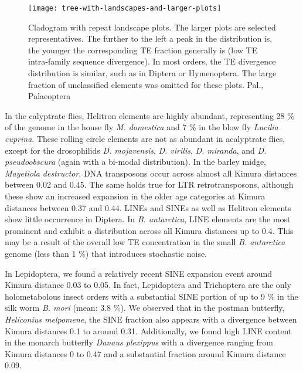 \begin{figure}[h!]
\begin{center}
\texttt{[image: tree-with-landscapes-and-larger-plots]}
\caption[Arthropod repeat landscapes]{{Cladogram with repeat landscape
plots.  The larger plots are selected representatives. The further to
the left a peak in the distribution is, the younger the corresponding TE
fraction generally is (low TE intra-family sequence divergence). In most
orders, the TE divergence distribution is similar, such as in Diptera or
Hymenoptera. The large fraction of unclassified elements was omitted for
these plots. Pal., Palaeoptera%
\label{fig:landscapes}
}}
\end{center}
\end{figure}


In the calyptrate flies, Helitron elements are highly abundant,
representing 28 \% of the genome in the house fly \emph{M. domestica}
and 7 \% in the blow fly \emph{Lucilia cuprina}. These rolling circle
elements are not as abundant in acalyptrate flies, except for the
drosophilids \emph{D. mojavensis}, \emph{D. virilis}, \emph{D. miranda},
and \emph{D. pseudoobscura} (again with a bi-modal distribution). In the
barley midge, \emph{Mayetiola destructor}, DNA transposons occur across
almost all Kimura distances between 0.02 and 0.45. The same holds true
for LTR retrotransposons, although these show an increased expansion in
the older age categories at Kimura distances between 0.37 and 0.44.
LINEs and SINEs as well as Helitron elements show little occurrence in
Diptera. In \emph{B. antarctica}, LINE elements are the most prominent
and exhibit a distribution across all Kimura distances up to 0.4. This
may be a result of the overall low TE concentration in the small
\emph{B. antarctica} genome (less than 1 \%) that introduces stochastic
noise.

In Lepidoptera, we found a relatively recent SINE expansion event around
Kimura distance 0.03 to 0.05. In fact, Lepidoptera and Trichoptera are
the only holometabolous insect orders with a substantial SINE portion of
up to 9 \% in the silk worm \emph{B. mori} (mean: 3.8 \%). We observed
that in the postman butterfly, \emph{Heliconius melpomene}, the SINE
fraction also appears with a divergence between Kimura distances 0.1 to
around 0.31. Additionally, we found high LINE content in the monarch
butterfly \emph{Danaus plexippus} with a divergence ranging from Kimura
distances 0 to 0.47 and a substantial fraction around Kimura distance
0.09.

